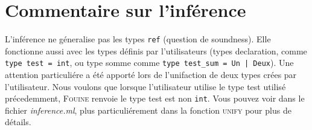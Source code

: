 \documentclass[paper=a4, fontsize=11pt, twocolumn]{article}
\begin{document}
\section{Commentaire sur l'inférence}
L'inférence ne géneralise pas les types \texttt{ref} (question de soundness). Elle fonctionne aussi avec les types définis par l'utilisateurs (types declaration, comme \texttt{type test = int}, ou type somme comme \texttt{type test\_sum = Un | Deux}). Une attention particuliére a été apporté lors de l'unifaction de deux types crées par l'utilisateur. Nous voulons que lorsque l'utilisateur utilise le type test utilisé précedemment, \textsc{Fouine} renvoie le type test est non \texttt{int}. Vous pouvez voir dans le fichier \textit{inference.ml}, plus particuliérement dans la fonction \textsc{unify} pour plus de détails.



 
\end{document}
